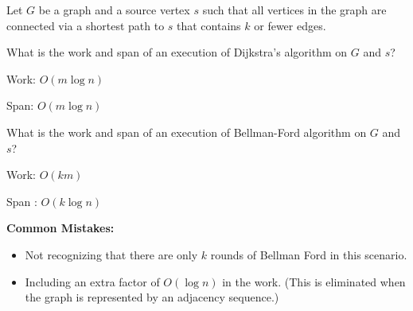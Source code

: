 \begin{problem}

Let $G$ be a graph and a source vertex $s$ such that all vertices in
the graph are connected via a shortest path to $s$ that contains $k$
or fewer edges.


What is the work and span of an execution of Dijkstra's algorithm on
$G$ and $s$?

\ask  Work:
\sol $O(m\log{n})$

\ask Span:
\sol $O(m\log{n})$



\ask
What is the work and span of an execution of Bellman-Ford algorithm on
$G$ and $s$?

\sol
Work: $O(km)$

\sol
Span : $O(k\log{n})$

\notes
\textbf{Common Mistakes:}
\begin{itemize}
	\item Not recognizing that there are only $k$ rounds of Bellman Ford in this
  scenario.

	\item Including an extra factor of $O(\log n)$ in the work. (This is
  eliminated when the graph is represented by an adjacency sequence.)
\end{itemize}
\end{problem}

